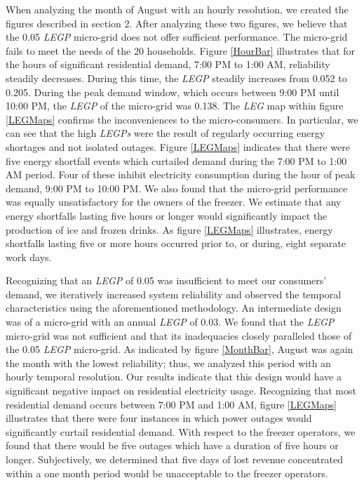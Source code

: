\documentclass{article}
\begin{document}
When analyzing the month of August with an hourly resolution, we created the figures described in section 2.
After analyzing these two figures, we believe that the 0.05 \emph{LEGP} micro-grid does not offer sufficient performance.
The micro-grid fails to meet the needs of the 20 households.
Figure \ref{HourBar} illustrates that for the hours of significant residential demand, 7:00 PM to 1:00 AM, reliability steadily decreases. 
During this time, the \emph{LEGP} steadily increases from 0.052 to 0.205. 
During the peak demand window, which occurs between 9:00 PM until 10:00 PM, the \emph{LEGP} of the micro-grid was 0.138.
The \emph{LEG} map within figure \ref{LEGMaps} confirms the inconveniences to the micro-consumers.
In particular, we can see that the high \emph{LEGPs} were the result of regularly occurring energy shortages and not isolated outages.
Figure \ref{LEGMaps} indicates that there were five energy shortfall events which curtailed demand during the 7:00 PM to 1:00 AM period.
Four of these inhibit electricity consumption during the hour of peak demand, 9:00 PM to 10:00 PM.
We also found that the micro-grid performance was equally unsatisfactory for the owners of the freezer.
We estimate that any energy shortfalls lasting five hours or longer would significantly impact the production of ice and frozen drinks. 
As figure \ref{LEGMaps} illustrates, energy shortfalls lasting five or more hours occurred prior to, or during, eight separate work days.
 

Recognizing that an \emph{LEGP} of 0.05 was insufficient to meet our consumers' demand, we iteratively increased system reliability and observed the temporal characteristics using the aforementioned methodology.
An intermediate design was of a micro-grid with an annual \emph{LEGP} of 0.03. 
We found that the \emph{LEGP} micro-grid was not sufficient and that its inadequacies closely paralleled those of the 0.05 \emph{LEGP} micro-grid.
As indicated by figure \ref{MonthBar}, August was again the month with the lowest reliability; thus, we analyzed this period with an hourly temporal resolution.
Our results indicate that this design would have a significant negative impact on residential electricity usage.
Recognizing that most residential demand occurs between 7:00 PM and 1:00 AM, figure \ref{LEGMaps} illustrates that there were four instances in which power outages would significantly curtail residential demand. 
With respect to the freezer operators, we found that there would be five outages which have a duration of five hours or longer. 
Subjectively, we determined that five days of lost revenue concentrated within a one month period would be unacceptable to the freezer operators. 
\end{document}
